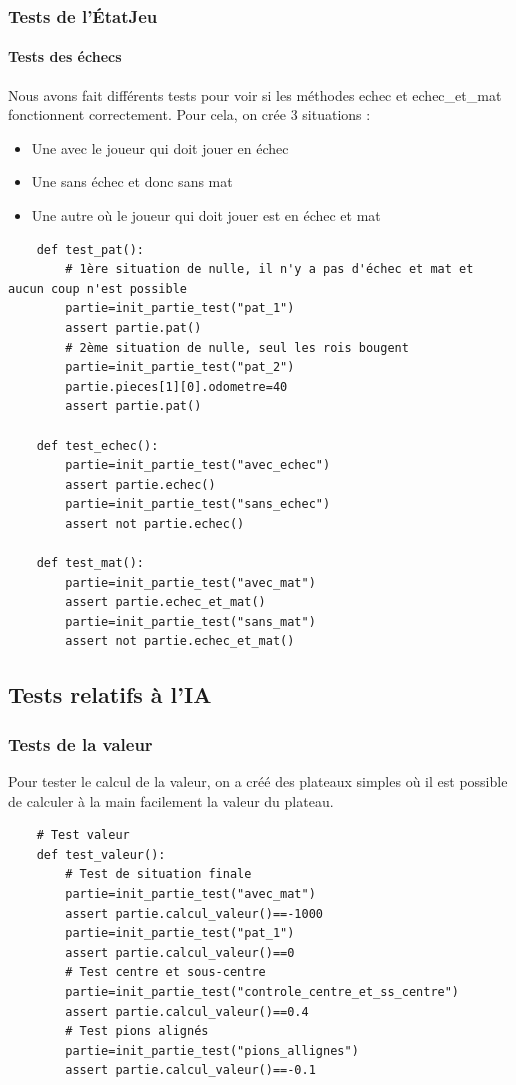 \documentclass{article}
\begin{document}
\subsubsection{Tests de l'ÉtatJeu}
\paragraph{Tests des échecs}

Nous avons fait différents tests pour voir si les méthodes echec et echec\_et\_mat fonctionnent correctement. Pour cela, on crée 3 situations :
\begin{itemize}
    \item Une avec le joueur qui doit jouer en échec
    \item Une sans échec et donc sans mat
    \item Une autre où le joueur qui doit jouer est en échec et mat
\end{itemize}

\begin{verbatim}
    def test_pat():
        # 1ère situation de nulle, il n'y a pas d'échec et mat et aucun coup n'est possible
        partie=init_partie_test("pat_1")
        assert partie.pat()
        # 2ème situation de nulle, seul les rois bougent
        partie=init_partie_test("pat_2")
        partie.pieces[1][0].odometre=40
        assert partie.pat()
        
    def test_echec():
        partie=init_partie_test("avec_echec")
        assert partie.echec()
        partie=init_partie_test("sans_echec")
        assert not partie.echec()
    
    def test_mat():
        partie=init_partie_test("avec_mat")
        assert partie.echec_et_mat()
        partie=init_partie_test("sans_mat")
        assert not partie.echec_et_mat()
\end{verbatim}

\subsection{Tests relatifs à l'IA}
\subsubsection{Tests de la valeur} 
Pour tester le calcul de la valeur, on a créé des plateaux simples où il est possible de calculer à la main facilement la valeur du plateau.

\begin{verbatim}
    # Test valeur
    def test_valeur():
        # Test de situation finale
        partie=init_partie_test("avec_mat")
        assert partie.calcul_valeur()==-1000
        partie=init_partie_test("pat_1")
        assert partie.calcul_valeur()==0
        # Test centre et sous-centre
        partie=init_partie_test("controle_centre_et_ss_centre")
        assert partie.calcul_valeur()==0.4
        # Test pions alignés
        partie=init_partie_test("pions_allignes")
        assert partie.calcul_valeur()==-0.1
\end{verbatim}

\
\end{document}
